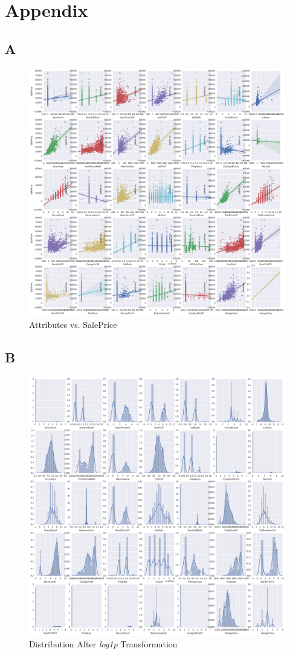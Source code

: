 \documentclass[12pt]{article}
\begin{document}
\newpage
\section*{Appendix}
\subsection*{A}
\begin{figure}[h!]
	\centering
	\includegraphics[width=\linewidth]{outliers_all.png}
	\caption{Attributes vs. SalePrice}
	\label{fig:A}
\end{figure}
\newpage
\subsection*{B}
\begin{figure}[h!]
	\centering
	\includegraphics[width=\linewidth]{skew_all.png}
	\caption{Distribution After \textit{log1p} Transformation}
	\label{fig:B}
\end{figure}
\end{document}
